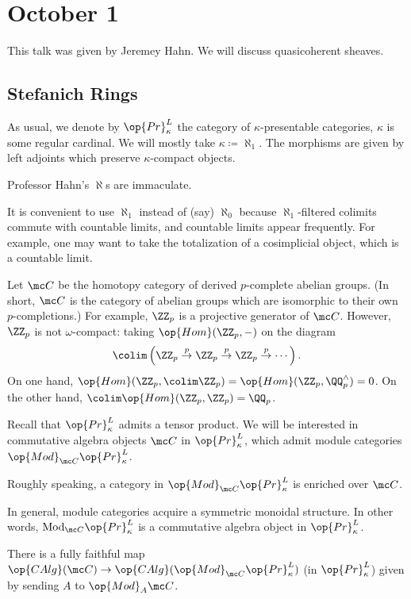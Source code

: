 \documentclass[../notes.tex]{subfiles}
\begin{document}
\section{October 1}
This talk was given by Jeremey Hahn. We will discuss quasicoherent sheaves.

\subsection{Stefanich Rings}
As usual, we denote by $\op{Pr}^L_\kappa$ the category of $\kappa$-presentable categories, $\kappa$ is some regular cardinal. We will mostly take $\kappa\coloneqq\aleph_1$. The morphisms are given by left adjoints which preserve $\kappa$-compact objects.
\begin{remark}
	Professor Hahn's $\aleph$s are immaculate.
\end{remark}
\begin{remark}
	It is convenient to use $\aleph_1$ instead of (say) $\aleph_0$ because $\aleph_1$-filtered colimits commute with countable limits, and countable limits appear frequently. For example, one may want to take the totalization of a cosimplicial object, which is a countable limit.
\end{remark}
\begin{example}
	Let $\mc C$ be the homotopy category of derived $p$-complete abelian groups. (In short, $\mc C$ is the category of abelian groups which are isomorphic to their own $p$-completions.) For example, $\ZZ_p$ is a projective generator of $\mc C$. However, $\ZZ_p$ is not $\omega$-compact: taking $\op{Hom}(\ZZ_p,-)$ on the diagram
	\[\colim\left(\ZZ_p\stackrel p\to\ZZ_p\stackrel p\to\ZZ_p\stackrel p\to\cdots\right).\]
	On one hand, $\op{Hom}(\ZZ_p,\colim\ZZ_p)=\op{Hom}(\ZZ_p,\QQ_p^\land)=0$. On the other hand, $\colim\op{Hom}(\ZZ_p,\ZZ_p)=\QQ_p$.
\end{example}
Recall that $\op{Pr}^L_\kappa$ admits a tensor product. We will be interested in commutative algebra objects $\mc C$ in $\op{Pr}^L_\kappa$, which admit module categories $\op{Mod}_{\mc C}\op{Pr}^L_\kappa$.
\begin{remark}
	Roughly speaking, a category in $\op{Mod}_{\mc C}\op{Pr}^L_\kappa$ is enriched over $\mc C$.
\end{remark}
In general, module categories acquire a symmetric monoidal structure. In other words, $\mathrm{Mod}_{\mc C}\op{Pr}^L_\kappa$ is a commutative algebra object in $\op{Pr}^L_\kappa$.
\begin{theorem} \label{thm:upgrade-pr}
	There is a fully faithful map $\op{CAlg}(\mc C)\to\op{CAlg}(\op{Mod}_{\mc C}\op{Pr}^L_\kappa)$ (in $\op{Pr}^L_\kappa$) given by sending $A$ to $\op{Mod}_A\mc C$.
\end{theorem}
\end{document}
